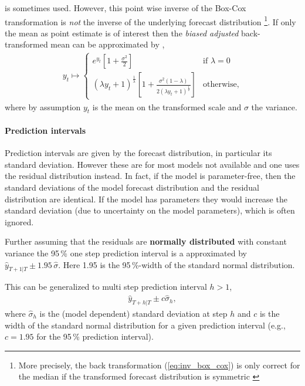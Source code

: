 \documentclass[12pt,a4paper]{article}
\begin{document}
\begin{itemize}
	is sometimes used. However, this point wise inverse of the Box-Cox transformation is \textit{not} the inverse of the underlying forecast distribution \footnote{More precisely, the back transformation (\ref{eq:inv_box_cox}) is only  correct for the median if the transformed forecast distribution is symmetric \cite{hyndman_forecasting_principles_2018}}. If only the mean as point estimate is of interest then the \textit{biased adjusted} back-transformed mean can be approximated by \cite{hyndman_blog_back_transform}, 
	\begin{align} \label{eq:inv_box_cox}
	y_t \mapsto 
	\begin{cases}
	e^{y_t}\left[1+\frac{\sigma^2}{2}\right] & \text{if } \lambda = 0\\ 
	(\lambda y_t + 1)^ \frac{1}{\lambda} \left[1+\frac{\sigma^2(1-\lambda)}{2(\lambda y_t + 1)^ \frac{1}{2} }\right] & \text{otherwise,}
	\end{cases}	
	\end{align}
	where by assumption $y_t$ is the mean on the transformed scale and  $\sigma$ the variance.
	  
\end{itemize}


\paragraph{Prediction intervals}
Prediction intervals are given by the forecast distribution, in particular its standard deviation. However these are for most models not available and one uses the residual distribution instead. In fact, if the model is parameter-free, then the standard deviations of the model forecast distribution and the residual distribution are identical. If the model has parameters they would increase the standard deviation (due to uncertainty on the model parameters), which is often ignored. 

Further assuming that the residuals are \textbf{normally distributed} with constant variance the 95\,\% one step prediction interval is a approximated by $\hat y_ {T+1 | T} \pm 1.95\,\hat \sigma$. Here 1.95 is the 95\,\%-width of the standard normal distribution.

This can be generalized to multi step prediction interval $h > 1$,   
\begin{align}\label{eq:gauss_prediction_error}
\hat y_ {T+h | T} \pm c\hat \sigma_h, 
\end{align}
where $\hat \sigma_h$ is the (model dependent) standard deviation at step $h$ and $c$ is the width of the standard normal distribution for a given prediction interval (e.g., $c=1.95$ for the 95\,\% prediction interval).
\end{document}
